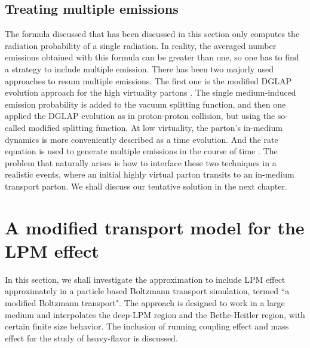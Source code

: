 \subsection{Treating multiple emissions}
The formula discussed that has been discussed in this section only computes the radiation probability of a single radiation.
In reality, the averaged number emissions obtained with this formula can be greater than one, so one has to find a strategy to include multiple emission.
There has been two majorly used approaches to resum multiple emissions.
The first one is the modified DGLAP evolution approach for the high virtuality partons \cite{Wang:2002pk,Cao:2017qpx}.
The single medium-induced emission probability is added to the vacuum splitting function, and then one applied the DGLAP evolution as in proton-proton collision, but using the so-called modified splitting function.
At low virtuality, the parton's in-medium dynamics is more conveniently described as a time evolution. 
And the rate equation is used to generate multiple emissions in the course of time \cite{Arnold:2002zm,Jeon:2003gi,Schenke:2009gb}.
The problem that naturally arises is how to interface these two techniques in a realistic events, where an initial highly virtual parton transits to an in-medium transport parton.
We shall discuss our tentative solution in the next chapter.


\section{A modified transport model for the LPM effect}
In this section, we shall investigate the approximation to include LPM effect approximately in a particle based Boltzmann transport simulation, termed ``a modified Boltzmann transport".
The approach is designed to work in a large medium and interpolates the deep-LPM region and the Bethe-Heitler region, with certain finite size behavior.
The inclusion of running coupling effect and mass effect for the study of heavy-flavor is discussed.

